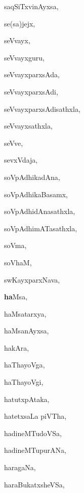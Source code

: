 \begin{multicols}{3}
{\noindent
{saqSiTxvinAyxsa}, \pageref{saqSiTxvinAyxsa}

\noindent
{se(sa)jejx}, \pageref{sesajejx}

\noindent
{seVvayx}, \pageref{seVvayx}

\noindent
{seVvayxguru}, \pageref{seVvayxguru}

\noindent
{seVvayxparxsAda}, \pageref{seVvayxparxsAda}

\noindent
{seVvayxparxsAdi}, \pageref{seVvayxparxsAdi}

\noindent
{seVvayxparxsAdisathxla}, \pageref{seVvayxparxsAdisathxla}

\noindent
{seVvayxsathxla}, \pageref{seVvayxsathxla}

\noindent
{seVve}, \pageref{seVve}

\noindent
{sevxVdaja}, \pageref{sevxVdaja}

\noindent
{soVpAdhikadAna}, \pageref{soVpAdhikadAna}

\noindent
{soVpAdhikaBasamx}, \pageref{soVpAdhikaBasamx}

\noindent
{soVpAdhidAnasathxla}, \pageref{soVpAdhidAnasathxla}

\noindent
{soVpAdhimATasathxla}, \pageref{soVpAdhimATasathxla}

\noindent
{soVma}, \pageref{soVma}

\noindent
{soVhaM}, \pageref{soVhaM}

\noindent
{swKayxparxNava}, \pageref{swKayxparxNava}

\noindent
{{\large\textbf{ha}}Msa}, \pageref{haMsa}

\noindent
{haMsatarxya}, \pageref{haMsatarxya}

\noindent
{haMsanAyxsa}, \pageref{haMsanAyxsa}

\noindent
{hakAra}, \pageref{hakAra}

\noindent
{haThayoVga}, \pageref{haThayoVga}

\noindent
{haThayoVgi}, \pageref{haThayoVgi}

\noindent
{hatutxpAtaka}, \pageref{hatutxpAtaka}

\noindent
{hatetxsaLa piVTha}, \pageref{hatetxsaLapiVTha}

\noindent
{hadineMTudoVSa}, \pageref{hadineMTudoVSa}

\noindent
{hadineMTupurANa}, \pageref{hadineMTupurANa}

\noindent
{haragaNa}, \pageref{haragaNa}

\noindent
{haraBukatxsheVSa}, \pageref{haraBukatxsheVSa}

}
\end{multicols}
